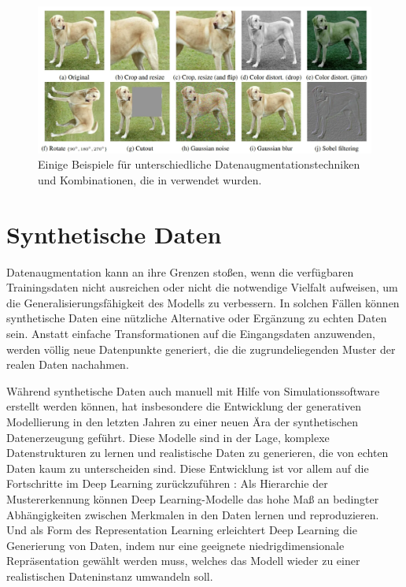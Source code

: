 \begin{figure}[h]
	\centering
	\includegraphics[width=14cm]{figure_data_augmentation.png}
	\caption{Einige Beispiele für unterschiedliche Datenaugmentationstechniken und Kombinationen, die in \parencite{Chen2020simclr} verwendet wurden.}
	\label{fig:data-augmentation}
\end{figure}

\section{Synthetische Daten} \label{sec:synt-data}

Datenaugmentation kann an ihre Grenzen stoßen, wenn die verfügbaren Trainingsdaten nicht ausreichen oder nicht die notwendige Vielfalt aufweisen, um die Generalisierungsfähigkeit des Modells zu verbessern. In solchen Fällen können synthetische Daten eine nützliche Alternative oder Ergänzung zu echten Daten sein. Anstatt einfache Transformationen auf die Eingangsdaten anzuwenden, werden völlig neue Datenpunkte generiert, die die zugrundeliegenden Muster der realen Daten nachahmen.

Während synthetische Daten auch manuell mit Hilfe von Simulationssoftware erstellt werden können, hat insbesondere die Entwicklung der generativen Modellierung in den letzten Jahren zu einer neuen Ära der synthetischen Datenerzeugung geführt. Diese Modelle sind in der Lage, komplexe Datenstrukturen zu lernen und realistische Daten zu generieren, die von echten Daten kaum zu unterscheiden sind. Diese Entwicklung ist vor allem auf die Fortschritte im Deep Learning zurückzuführen \parencite{Foster2020gendeeplearning}: Als Hierarchie der Mustererkennung können Deep Learning-Modelle das hohe Maß an bedingter Abhängigkeiten zwischen Merkmalen in den Daten lernen und reproduzieren. Und als Form des Representation Learning erleichtert Deep Learning die Generierung von Daten, indem nur eine geeignete niedrigdimensionale Repräsentation gewählt werden muss, welches das Modell wieder zu einer realistischen Dateninstanz umwandeln soll.

